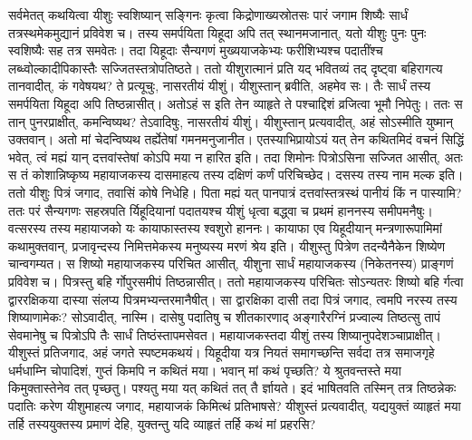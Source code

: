 \adhyAya
{}
\vakya सर्वमेतत् कथयित्वा यीशुः स्वशिष्यान् सङ्गिनः कृत्वा किद्रोणाख्यस्रोतसः पारं जगाम शिष्यैः सार्धं तत्रस्थमेकमुद्यानं प्रविवेश च।
\vakya तस्य समर्पयिता यिहूदा अपि तत् स्थानमजानात्, यतो यीशुः पुनः पुनः स्वशिष्यैः सह तत्र समवेतः।
\vakya तदा यिहूदाः सैन्यगणं मुख्ययाजकेभ्यः फरीशिभ्यश्च पदातींश्च लब्ध्वोल्कादीपिकास्तैः सज्जितस्तत्रोपतिष्ठते।
\vakya ततो यीशुरात्मानं प्रति यद् भवितव्यं तद् दृष्ट्वा बहिरागत्य तानवादीत्, कं गवेषयथ?
\vakya ते प्रत्यूचुः, नासरतीयं यीशुं। यीशुस्तान् ब्रवीति, अहमेव सः। तैः सार्धं तस्य समर्पयिता यिहूदा अपि तिष्ठन्नासीत्।
\vakya अतोऽहं स इति तेन व्याहृते ते पश्चाद्दिशं व्रजित्वा भूमौ निपेतुः।
\vakya ततः स तान् पुनरप्राक्षीत्, कमन्विष्यथ? तेऽवादिषुः, नासरतीयं यीशुं।
\vakya यीशुस्तान् प्रत्यवादीत्, अहं सोऽस्मीति युष्मान् उक्तवान्। अतो मां चेदन्विष्यथ तर्ह्येतेषां गमनमनुजानीत।
\vakya एतस्याभिप्रायोऽयं यत् तेन कथितमिदं वचनं सिद्धिं भवेत्, त्वं मह्यं यान् दत्तवांस्तेषां कोऽपि मया न हारित इति।
\vakya तदा शिमोनः पित्रोऽसिना सज्जित आसीत्, अतः स तं कोशान्निष्कृष्य महायाजकस्य दासमाहत्य तस्य दक्षिणं कर्णं परिचिच्छेद। दसस्य तस्य नाम मल्क इति।
\vakya ततो यीशुः पित्रं जगाद, तवासिं कोषे निधेहि। पिता मह्यं यत् पानपात्रं दत्तवांस्तत्रस्थं पानीयं किं न पास्यामि?
\vakya ततः परं सैन्यगणः सहस्रपति र्यिहूदियानां पदातयश्च यीशुं धृत्वा बद्ध्वा च प्रथमं हाननस्य समीपमनैषुः।
\vakya वत्सरस्य तस्य महायाजको यः कायाफास्तस्य श्वशुरो हाननः।
\vakya कायाफा एव यिहूदीयान् मन्त्रणारूपामिमां कथामुक्तवान्, प्रजावृन्दस्य निमित्तमेकस्य मनुष्यस्य मरणं श्रेय इति।
\vakya यीशुस्तु पित्रेण तदन्यैनैकेन शिष्येण चान्वगम्यत। स शिष्यो महायाजकस्य परिचित आसीत्, यीशुना सार्धं महायाजकस्य (निकेतनस्य) प्राङ्गणं प्रविवेश च।
\vakya पित्रस्तु बहि र्गोपुरसमीपं तिष्ठन्नासीत्। ततो महायाजकस्य परिचितः सोऽन्यतरः शिष्यो बहि र्गत्वा द्वाररक्षिकया दास्या संलप्य पित्रमभ्यन्तरमानैषीत्।
\vakya सा द्वारक्षिका दासी तदा पित्रं जगाद, त्वमपि नरस्य तस्य शिष्याणामेकः? सोऽवादीत्, नास्मि।
\vakya दासेषु पदातिषु च शीतकारणाद् अङ्गारैरग्निं प्रज्वाल्य तिष्ठत्सु तापं सेवमानेषु च पित्रोऽपि तैः सार्धं तिष्ठंस्तापमसेवत।
\vakya महायाजकस्तदा यीशुं तस्य शिष्यानुपदेशञ्चाप्राक्षीत्। 
\vakya यीशुस्तं प्रतिजगाद, अहं जगते स्पष्टमकथयं। यिहूदीया यत्र नियतं समागच्छन्ति सर्वदा तत्र समाजगृहे धर्मधाम्नि चोपादिशं, गुप्तं किमपि न कथितं मया।
\vakya भवान् मां कथं पृच्छति? ये श्रुतवन्तस्ते मया किमुक्तास्तेनेव तत् पृच्छतु। पश्यतु मया यत् कथितं तत् तै र्ज्ञायते।
\vakya इदं भाषितवति तस्मिन् तत्र तिष्ठन्नेकः पदातिः करेण यीशुमाहत्य जगाद, महायाजकं किमित्थं प्रतिभाषसे?
\vakya यीशुस्तं प्रत्यवादीत्, यद्ययुक्तं व्याहृतं मया तर्हि तस्ययुक्तस्य प्रमाणं देहि, युक्तन्तु यदि व्याहृतं तर्हि कथं मां प्रहरसि?
